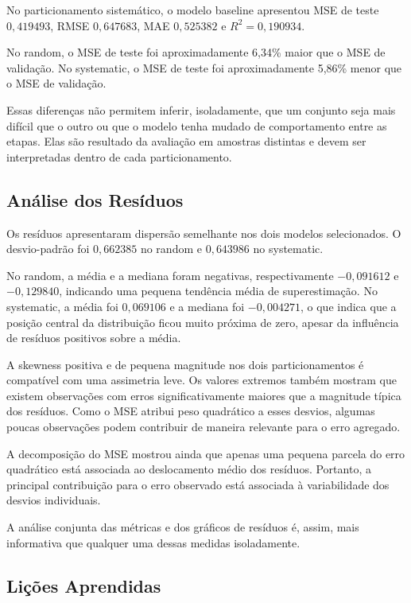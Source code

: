 \documentclass[11pt,a4paper]{article}
\begin{document}
No particionamento sistemático, o modelo baseline apresentou MSE de
teste $0,419493$, RMSE $0,647683$, MAE $0,525382$ e
$R^2=0,190934$.

No random, o MSE de teste foi aproximadamente 6,34\% maior que o MSE de
validação. No systematic, o MSE de teste foi aproximadamente 5,86\%
menor que o MSE de validação.

Essas diferenças não permitem inferir, isoladamente, que um conjunto
seja mais difícil que o outro ou que o modelo tenha mudado de
comportamento entre as etapas. Elas são resultado da avaliação em
amostras distintas e devem ser interpretadas dentro de cada
particionamento.


\subsection{Análise dos Resíduos}

Os resíduos apresentaram dispersão semelhante nos dois modelos
selecionados. O desvio-padrão foi $0,662385$ no random e $0,643986$ no
systematic.

No random, a média e a mediana foram negativas, respectivamente
$-0,091612$ e $-0,129840$, indicando uma pequena tendência média de
superestimação. No systematic, a média foi $0,069106$ e a mediana foi
$-0,004271$, o que indica que a posição central da distribuição ficou
muito próxima de zero, apesar da influência de resíduos positivos sobre
a média.

A skewness positiva e de pequena magnitude nos dois particionamentos é
compatível com uma assimetria leve. Os valores extremos também mostram
que existem observações com erros significativamente maiores que a
magnitude típica dos resíduos. Como o MSE atribui peso quadrático a
esses desvios, algumas poucas observações podem contribuir de maneira
relevante para o erro agregado.

A decomposição do MSE mostrou ainda que apenas uma pequena parcela do
erro quadrático está associada ao deslocamento médio dos resíduos.
Portanto, a principal contribuição para o erro observado está
associada à variabilidade dos desvios individuais.

A análise conjunta das métricas e dos gráficos de resíduos é, assim,
mais informativa que qualquer uma dessas medidas isoladamente.


\subsection{Lições Aprendidas}
\end{document}

